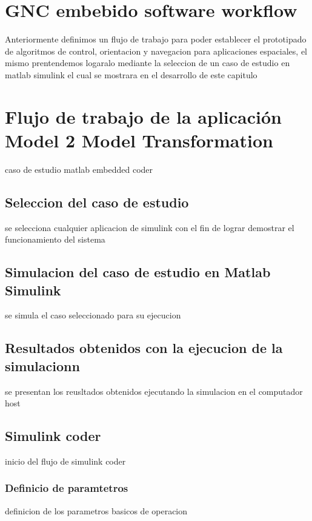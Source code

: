 \section{GNC embebido software workflow}

Anteriormente definimos un flujo de trabajo para poder establecer el prototipado de algoritmos de control, orientacion y navegacion para aplicaciones espaciales, el mismo prentendemos logaralo mediante la seleccion de un caso de estudio en matlab simulink el cual se mostrara en el desarrollo de este capitulo

\section{Flujo de trabajo de la aplicación Model 2 Model Transformation}
caso de estudio matlab embedded coder


\subsection{Seleccion del caso de estudio}

se selecciona cualquier aplicacion de simulink con el fin de lograr demostrar el funcionamiento del sistema

\subsection{Simulacion del caso de estudio en Matlab Simulink}

se simula el caso seleccionado para su ejecucion 

\subsection{Resultados obtenidos con la ejecucion de la simulacionn}

se presentan los reusltados obtenidos ejecutando la simulacion en el computador host

\subsection{Simulink coder}

inicio del flujo de simulink coder 

\subsubsection{Definicio de paramtetros}

definicion de los parametros basicos de operacion

